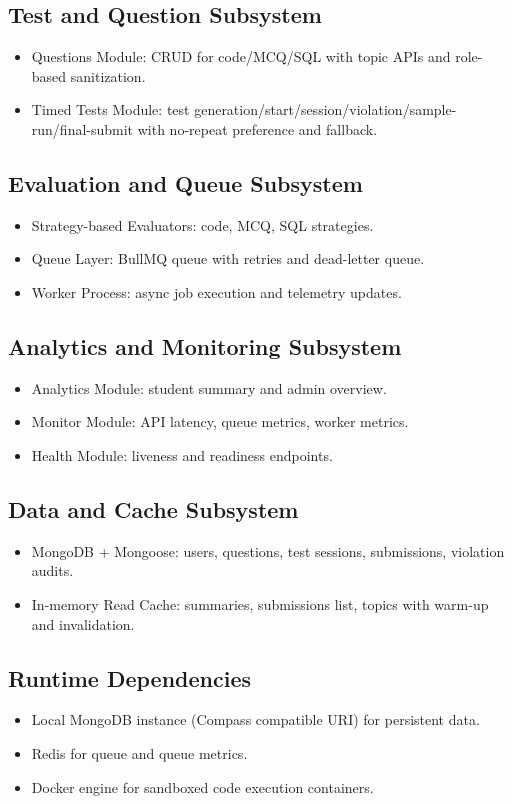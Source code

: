 \documentclass[12pt,journal,onecolumn]{IEEEtran}
\begin{document}
\subsection{Test and Question Subsystem}
\begin{itemize}
    \item Questions Module: CRUD for code/MCQ/SQL with topic APIs and role-based sanitization.
    \item Timed Tests Module: test generation/start/session/violation/sample-run/final-submit with no-repeat preference and fallback.
\end{itemize}

\subsection{Evaluation and Queue Subsystem}
\begin{itemize}
    \item Strategy-based Evaluators: code, MCQ, SQL strategies.
    \item Queue Layer: BullMQ queue with retries and dead-letter queue.
    \item Worker Process: async job execution and telemetry updates.
\end{itemize}

\subsection{Analytics and Monitoring Subsystem}
\begin{itemize}
    \item Analytics Module: student summary and admin overview.
    \item Monitor Module: API latency, queue metrics, worker metrics.
    \item Health Module: liveness and readiness endpoints.
\end{itemize}

\subsection{Data and Cache Subsystem}
\begin{itemize}
    \item MongoDB + Mongoose: users, questions, test sessions, submissions, violation audits.
    \item In-memory Read Cache: summaries, submissions list, topics with warm-up and invalidation.
\end{itemize}

\subsection{Runtime Dependencies}
\begin{itemize}
    \item Local MongoDB instance (Compass compatible URI) for persistent data.
    \item Redis for queue and queue metrics.
    \item Docker engine for sandboxed code execution containers.
\end{itemize}
\end{document}
